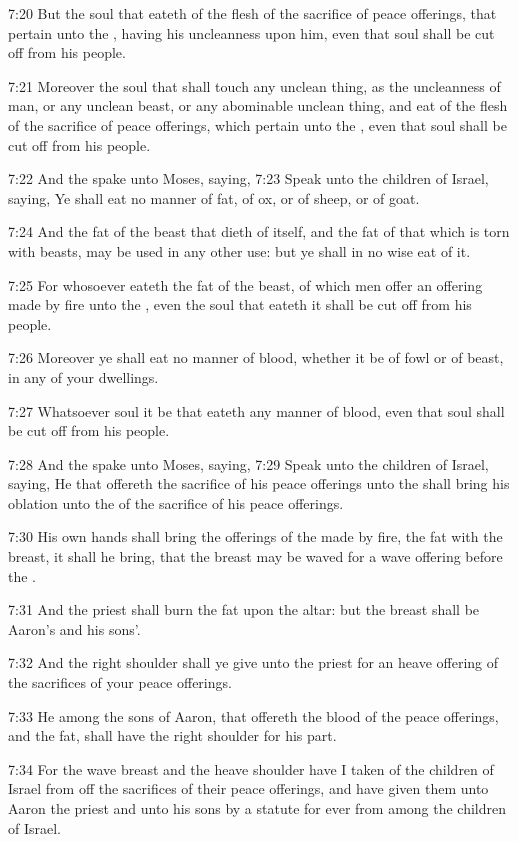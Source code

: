 7:20 But the soul that eateth of the flesh of the sacrifice of peace
offerings, that pertain unto the \LORD, having his uncleanness upon
him, even that soul shall be cut off from his people.

7:21 Moreover the soul that shall touch any unclean thing, as the
uncleanness of man, or any unclean beast, or any abominable unclean
thing, and eat of the flesh of the sacrifice of peace offerings, which
pertain unto the \LORD, even that soul shall be cut off from his
people.

7:22 And the \LORD spake unto Moses, saying, 7:23 Speak unto the
children of Israel, saying, Ye shall eat no manner of fat, of ox, or
of sheep, or of goat.

7:24 And the fat of the beast that dieth of itself, and the fat of
that which is torn with beasts, may be used in any other use: but ye
shall in no wise eat of it.

7:25 For whosoever eateth the fat of the beast, of which men offer an
offering made by fire unto the \LORD, even the soul that eateth it
shall be cut off from his people.

7:26 Moreover ye shall eat no manner of blood, whether it be of fowl
or of beast, in any of your dwellings.

7:27 Whatsoever soul it be that eateth any manner of blood, even that
soul shall be cut off from his people.

7:28 And the \LORD spake unto Moses, saying, 7:29 Speak unto the
children of Israel, saying, He that offereth the sacrifice of his
peace offerings unto the \LORD shall bring his oblation unto the \LORD
of the sacrifice of his peace offerings.

7:30 His own hands shall bring the offerings of the \LORD made by fire,
the fat with the breast, it shall he bring, that the breast may be
waved for a wave offering before the \LORD.

7:31 And the priest shall burn the fat upon the altar: but the breast
shall be Aaron's and his sons'.

7:32 And the right shoulder shall ye give unto the priest for an heave
offering of the sacrifices of your peace offerings.

7:33 He among the sons of Aaron, that offereth the blood of the peace
offerings, and the fat, shall have the right shoulder for his part.

7:34 For the wave breast and the heave shoulder have I taken of the
children of Israel from off the sacrifices of their peace offerings,
and have given them unto Aaron the priest and unto his sons by a
statute for ever from among the children of Israel.

